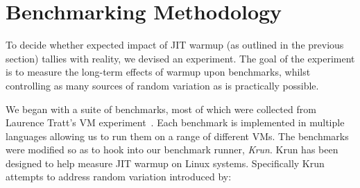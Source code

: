 \documentclass[10pt,preprint]{sigplanconf}
\begin{document}
\section{Benchmarking Methodology}
\label{sec:methodology}

To decide whether expected impact of JIT warmup (as outlined in the previous
section) tallies with reality, we devised an experiment.  The goal of the
experiment is to measure the long-term effects of warmup upon benchmarks,
whilst controlling as many sources of random variation as is practically
possible.

We began with a suite of benchmarks, most of which were collected from Laurence
Tratt's VM experiment~\cite{XXX}. Each benchmark is implemented in multiple
languages allowing us to run them on a range of different VMs. The benchmarks
were modified so as to hook into our benchmark runner, \emph{Krun}. Krun has
been designed to
help measure JIT warmup on Linux systems. Specifically Krun attempts to address
random variation introduced by:
%
\end{document}
